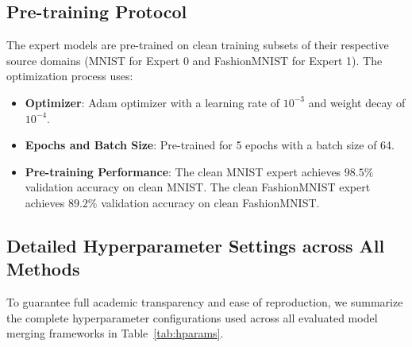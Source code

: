 \documentclass{article}
\theoremstyle{definition}
\theoremstyle{remark}
\begin{document}
\subsection{Pre-training Protocol}
The expert models are pre-trained on clean training subsets of their respective source domains (MNIST for Expert 0 and FashionMNIST for Expert 1). The optimization process uses:
\begin{itemize}
    \item \textbf{Optimizer}: Adam optimizer with a learning rate of $10^{-3}$ and weight decay of $10^{-4}$.
    \item \textbf{Epochs and Batch Size}: Pre-trained for 5 epochs with a batch size of 64.
    \item \textbf{Pre-training Performance}: The clean MNIST expert achieves $98.5\%$ validation accuracy on clean MNIST. The clean FashionMNIST expert achieves $89.2\%$ validation accuracy on clean FashionMNIST.
\end{itemize}

\subsection{Detailed Hyperparameter Settings across All Methods}
To guarantee full academic transparency and ease of reproduction, we summarize the complete hyperparameter configurations used across all evaluated model merging frameworks in Table~\ref{tab:hparams}.

\begin{table}[H]
\caption{Complete hyperparameter settings for all compared model merging methods.}
\label{tab:hparams}
\vskip 0.15in
\begin{center}
\begin{small}
\end{small}
\end{center}
\end{table}
\end{document}

